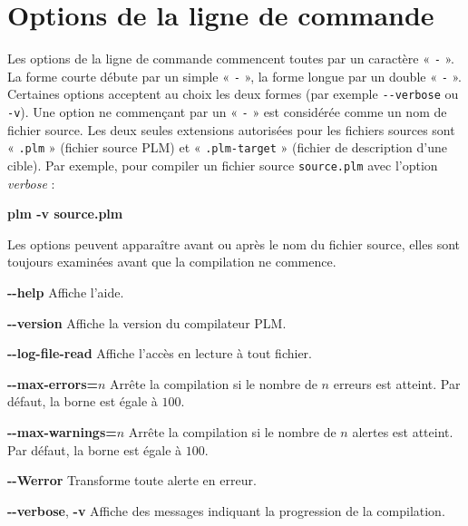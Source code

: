 

\newcommand\OPTION[1]{\colorbox{gray!15}{\ttfamily\bfseries #1}}


\chapter{Options de la ligne de commande}

Les options de la ligne de commande commencent toutes par un caractère « \texttt{-} ». La forme courte débute par un simple « \texttt{-} », la forme longue par un double « \texttt{-} ». Certaines options acceptent au choix les deux formes (par exemple \texttt{-{}-verbose} ou \texttt{-v}). Une option ne commençant par un « \texttt{-} » est considérée comme un nom de fichier source. Les deux seules extensions autorisées pour les fichiers sources sont « \texttt{.plm} » (fichier source PLM) et  « \texttt{.plm-target} » (fichier de description d'une cible). Par exemple, pour compiler un fichier source \texttt{source.plm} avec l'option \emph{verbose} :

\begin{SHELL}
\bfseries plm -v source.plm
\end{SHELL}

Les options peuvent apparaître avant ou après le nom du fichier source, elles sont toujours examinées avant que la compilation ne commence.



\OPTION{-{}-help} Affiche l'aide.


\OPTION{-{}-version} Affiche la version du compilateur PLM.



\OPTION{-{}-log-file-read} Affiche l'accès en lecture à tout fichier.

\OPTION{-{}-max-errors=$n$} Arrête la compilation si le nombre de $n$ erreurs est atteint. Par défaut, la borne est égale à $100$.

\OPTION{-{}-max-warnings=$n$} Arrête la compilation si le nombre de $n$ alertes est atteint. Par défaut, la borne est égale à $100$.

\OPTION{-{}-Werror} Transforme toute alerte en erreur.

\OPTION{-{}-verbose}, \OPTION{-v} Affiche des messages indiquant la progression de la compilation.








